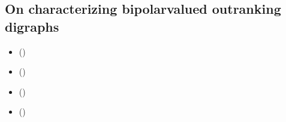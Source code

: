 \documentclass[a4paper,12pt,english]{sphinxhowto}
\begin{document}
\subsection{On characterizing bipolar\sphinxhyphen{}valued outranking digraphs}
\label{\detokenize{pearls:on-characterizing-bipolar-valued-outranking-digraphs}}\label{\detokenize{pearls:sufficiency-tutorial-label}}
\begin{sphinxcontents}
\begin{itemize}
\item {} 
\sphinxAtStartPar
{}\label{\detokenize{pearls:id206}}{\hyperref[\detokenize{pearls:necessary-properties-of-the-outranking-digraph}]{}} ()

\item {} 
\sphinxAtStartPar
{}\label{\detokenize{pearls:id207}}{\hyperref[\detokenize{pearls:partial-tournaments-may-be-strict-outranking-digraphs}]{}} ()

\item {} 
\sphinxAtStartPar
{}\label{\detokenize{pearls:id208}}{\hyperref[\detokenize{pearls:recognizing-bipolar-outranking-valuations}]{}} ()

\item {} 
\sphinxAtStartPar
{}\label{\detokenize{pearls:id209}}{\hyperref[\detokenize{pearls:on-generating-random-outranking-valuations}]{}} ()

\end{itemize}
\end{sphinxcontents}
\end{document}
